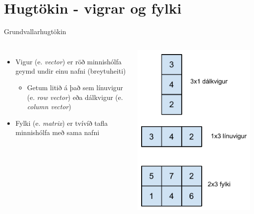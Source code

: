 \documentclass[handout]{beamer}
\begin{document}
\section{Hugtökin - vigrar og fylki}

\begin{frame}{Grundvallarhugtökin}
\begin{columns}
\begin{itemize}
 \item Vigur (e. \emph{vector}) er röð minnishólfa geymd undir einu nafni (breytuheiti)
 \begin{itemize}
  \item Getum litið á það sem línuvigur (e. \emph{row vector}) eða dálkvigur (e. \emph{column vector})
 \end{itemize}
 \item Fylki (e. \emph{matrix}) er tvívíð tafla minnishólfa með sama nafni
\end{itemize}
\begin{center}
\includegraphics[height=0.8\textheight]{Pics/vigrar-og-fylki}
\end{center}
\end{columns}
\end{frame}
\end{document}
